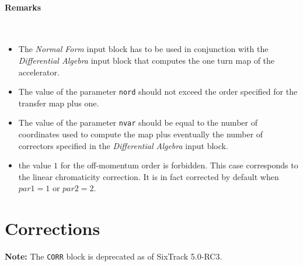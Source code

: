 \paragraph{Remarks}~
\begin{itemize}
    \item The \textit{Normal Form} input block has to be used in conjunction with the \textit{Differential Algebra} input block that computes the one turn map of the accelerator.
    \item The value of the parameter \texttt{nord} should not exceed the order specified for the transfer map plus one.
    \item The value of the parameter \texttt{nvar} should be equal to the number of coordinates used to compute the map plus eventually the number of correctors specified in the \textit{Differential Algebra} input block.
    \item the value $1$ for the off-momentum order is forbidden. This case corresponds to the linear chromaticity correction. It is in fact corrected by default when $par1 =1$ or $par2 =2$.
\end{itemize}

\section{Corrections} \label{Corrections}

\textcolor{notered}{\textbf{Note:}
The \texttt{CORR} block is deprecated as of SixTrack 5.0-RC3.}




